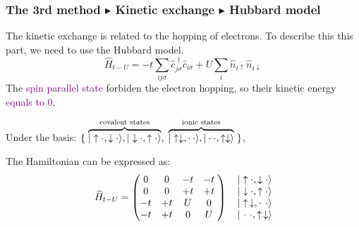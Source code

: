 \documentclass{beamer}
\begin{document}
  \begin{frame}
    \frametitle{The 3rd method \(\blacktriangleright\) Kinetic exchange \(\blacktriangleright\) Hubbard model}
    The kinetic exchange is related to the hopping of electrons. To describe this this part, we need to use the Hubbard model.
    \begin{equation}
      \widehat{H}_{t-U} = -t \sum_{ij\sigma}\widehat{c}^{\;\dagger}_{j\sigma}\widehat{c}_{i\sigma} + U \sum_i \widehat{n}_{i\uparrow}\widehat{n}_{i\downarrow}
    \end{equation}
    The \textcolor{purple}{spin parallel state} forbiden the electron hopping, so their kinetic energy \textcolor{purple}{equals to 0}.

    Under the basis: \(\{\;\overbrace{|\uparrow\cdot,\downarrow\cdot\rangle,|\downarrow\cdot,\uparrow\cdot\rangle}^{\text{covalent states}},\;\overbrace{|\uparrow\downarrow,\cdot\hspace{0.2em}\cdot\rangle,|\cdot\cdot,\uparrow\downarrow\rangle}^{\text{ionic states}}\;\}\),
    
    The Hamiltonian can be expressed as:
    \begin{equation}
      \widehat{H}_{t-U} = \begin{pmatrix}
        0 &  0 & -t & -t \;\\
        0 &  0 & +t & +t \;\\
       -t & +t &  U &  0 \;\\
       -t & +t &  0 &  U \;
      \end{pmatrix}\ \ \ \begin{matrix}
        |\uparrow\cdot,\downarrow\cdot\rangle\\
        |\downarrow\cdot,\uparrow\cdot\rangle\\
        |\uparrow\hspace{0.15em}\downarrow,\cdot\hspace{0.4em}\cdot\rangle\\
        |\hspace{0.1em}\cdot\hspace{0.15em}\cdot,\uparrow\hspace{0.15em}\downarrow\rangle
      \end{matrix}
    \end{equation}
  \end{frame}
\end{document}
